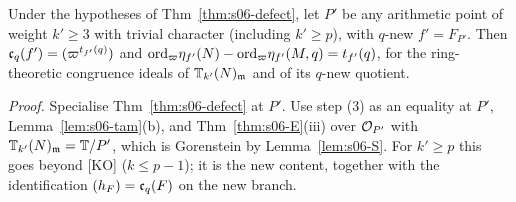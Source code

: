\begin{corollary}\label{cor:s06-allweights}
Under the hypotheses of Thm~\ref{thm:s06-defect}, let $P'$ be any arithmetic point of weight $k'\ge3$ with trivial character
(including $k'\ge p$), with $q$-new $f'=F_{P'}$. Then $\mathfrak{c}_q(f')=(\varpi^{t_{f'}(q)})$ and
$\mathrm{ord}_\varpi\eta_{f'}(N)-\mathrm{ord}_\varpi\eta_{f'}(M,q)=t_{f'}(q)$, for the ring-theoretic congruence ideals of $\mathbb{T}_{k'}(N)_{\mathfrak{m}}$ and of its
$q$-new quotient. \stpmc{}
\end{corollary}
\noindent\emph{Proof.} Specialise Thm~\ref{thm:s06-defect} at $P'$. Use step (3) as an equality at $P'$, Lemma~\ref{lem:s06-tam}(b),
and Thm~\ref{thm:s06-E}(iii) over $\mathcal{O}_{P'}$ with $\mathbb{T}_{k'}(N)_{\mathfrak{m}}=\mathbb{T}/P'$, which is Gorenstein by Lemma~\ref{lem:s06-S}. For $k'\ge p$
this goes beyond [KO] ($k\le p-1$); it is the new content, together with the identification $(h_F)=\mathfrak{c}_q(F)$ on the new branch.

